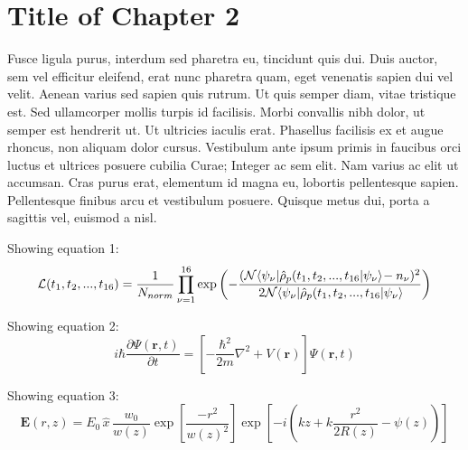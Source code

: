 
\chapter{Title of Chapter 2} %

\label{Chapter2} %




Fusce ligula purus, interdum sed pharetra eu, tincidunt quis dui. Duis auctor, sem vel efficitur eleifend, erat nunc pharetra quam, eget venenatis sapien dui vel velit. Aenean varius sed sapien quis rutrum. Ut quis semper diam, vitae tristique est. Sed ullamcorper mollis turpis id facilisis. Morbi convallis nibh dolor, ut semper est hendrerit ut. Ut ultricies iaculis erat. Phasellus facilisis ex et augue rhoncus, non aliquam dolor cursus. Vestibulum ante ipsum primis in faucibus orci luctus et ultrices posuere cubilia Curae; Integer ac sem elit. Nam varius ac elit ut accumsan. Cras purus erat, elementum id magna eu, lobortis pellentesque sapien. Pellentesque finibus arcu et vestibulum posuere. Quisque metus dui, porta a sagittis vel, euismod a nisl.
\newline

Showing equation 1:
\begin{equation}
  \label{eq1}
  \mathcal{L}(t_1, t_2, ..., t_{16}) = 
  \frac{1}{N_{norm}} \prod_{\nu = 1}^{16} \exp \left( -\frac{(\mathcal{N} \matrixel{\psi_{\nu}}{\hat\rho_p(t_1, t_2, ..., t_{16}}{\psi_{\nu}} - n_{\nu})^2}{2\mathcal{N}\matrixel{\psi_{\nu}}{\hat\rho_p(t_1, t_2, ..., t_{16}}{\psi_{\nu}}} \right)
\end{equation}

Showing equation 2:
\begin{equation}
  \label{eq:eq2}
  i\hbar\frac{\partial \Psi(\textbf{r},t)}{\partial t} = \left[ -\frac{\hbar^2}{2m}\nabla^2 + V(\textbf{r})\right]\Psi(\textbf{r},t)
\end{equation}

Showing equation 3:
\begin{equation}
  \label{eq:GaussianBeam}
  {\mathbf E(r,z)} = E_0 \, \hat{x} \, \frac{w_0}{w(z)} \exp  \left[ \frac{-r^2}{w(z)^2}\right]  \exp  \left[ -i  \! \left(kz +k \frac{r^2}{2R(z)} - \psi(z) \! \right)  \right] 
\end{equation}

